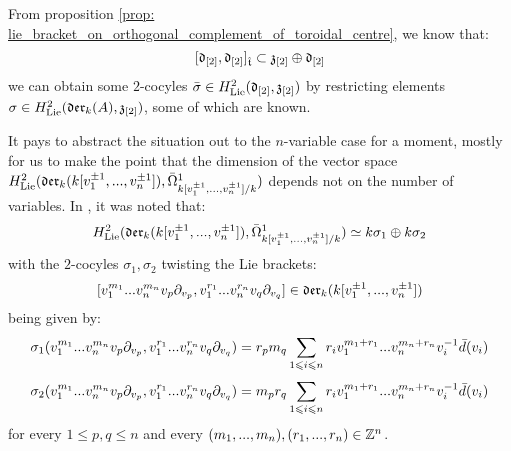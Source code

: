         \begin{remark} \label{remark: non_uniqueness_of_yangian_extended_lie_algebras}
            From proposition \ref{prop: lie_bracket_on_orthogonal_complement_of_toroidal_centre}, we know that:
                $$[\mathfrak{d}_{[2]}, \mathfrak{d}_{[2]}]_{\hat{\mathfrak{t}}} \subset \mathfrak{z}_{[2]} \oplus \mathfrak{d}_{[2]}$$
            we can obtain some $2$-cocyles $\bar{\sigma} \in H^2_{\mathrm{Lie}}(\mathfrak{d}_{[2]}, \mathfrak{z}_{[2]})$ by restricting elements $\sigma \in H^2_{\mathrm{Lie}}(\mathfrak{der}_{k}(A), \mathfrak{z}_{[2]})$, some of which are known.

            It pays to abstract the situation out to the $n$-variable case for a moment, mostly for us to make the point that the dimension of the vector space $H^2_{\mathrm{Lie}}(\mathfrak{der}_{k}(k[v_1^{\pm 1}, ..., v_n^{\pm 1}]), \bar{\Omega}^1_{k[v_1^{\pm 1}, ..., v_n^{\pm 1}]/k})$ depends not on the number of variables. In \cite[pp. 5, below Equation 1.3]{billig_energy_momentum_tensor}, it was noted that:
                $$H^2_{\mathrm{Lie}}(\mathfrak{der}_{k}(k[v_1^{\pm 1}, ..., v_n^{\pm 1}]), \bar{\Omega}^1_{k[v_1^{\pm 1}, ..., v_n^{\pm 1}]/k}) \simeq k \sigma_1 \oplus k \sigma_2$$
            with the $2$-cocyles $\sigma_1, \sigma_2$ twisting the Lie brackets:
                $$[v_1^{m_1} ... v_n^{m_n} v_p \partial_{v_p}, v_1^{r_1} ... v_n^{r_n} v_q \partial_{v_q}] \in \mathfrak{der}_{k}(k[v_1^{\pm 1}, ..., v_n^{\pm 1}])$$
            being given by:
                $$\sigma_1(v_1^{m_1} ... v_n^{m_n} v_p \partial_{v_p}, v_1^{r_1} ... v_n^{r_n} v_q \partial_{v_q}) = r_p m_q \sum_{1 \leqslant i \leqslant n} r_i v_1^{m_1 + r_1} ... v_n^{m_n + r_n} v_i^{-1} \bar{d}(v_i)$$
                $$\sigma_2(v_1^{m_1} ... v_n^{m_n} v_p \partial_{v_p}, v_1^{r_1} ... v_n^{r_n} v_q \partial_{v_q}) = m_p r_q \sum_{1 \leqslant i \leqslant n} r_i v_1^{m_1 + r_1} ... v_n^{m_n + r_n} v_i^{-1} \bar{d}(v_i)$$
            for every $1 \leq p, q \leq n$ and every $(m_1, ..., m_n), (r_1, ..., r_n) \in \mathbb{Z}^n$. 


\end{remark}
